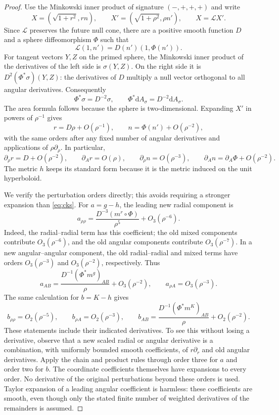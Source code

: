\begin{proof}
Use the Minkowski inner product of signature $(-,+,+,+)$ and write
\[
 X=(\sqrt{1+r^2},rn),\qquad
 X'=(\sqrt{1+\rho^2},\rho n'),\qquad X=\mathscr L X'.
\]
Since $\mathscr L$ preserves the future null cone, there are a positive
smooth function $D$ and a sphere diffeomorphism $\Phi$ such that
\begin{equation}\label{eq:lorentz-boundary}
 \mathscr L(1,n')=D(n')(1,\Phi(n')).
\end{equation}
For tangent vectors $Y,Z$ on the primed sphere, the Minkowski
inner product of the derivatives of the left side is $\sigma(Y,Z)$.
On the right side it is $D^2(\Phi^*\sigma)(Y,Z)$: the derivatives of
$D$ multiply a null vector orthogonal to all angular derivatives.
Consequently
\begin{equation}\label{eq:lorentz-conformal}
 \Phi^*\sigma=D^{-2}\sigma,
 \qquad \Phi^*\mathrm dA_\sigma=D^{-2}\mathrm dA_\sigma.
\end{equation}
The area formula follows because the sphere is two-dimensional.
Expanding $X'$ in powers of $\rho^{-1}$ gives
\[
 r=D\rho+O(\rho^{-1}),\qquad
 n=\Phi(n')+O(\rho^{-2}),
\]
with the same orders after any fixed number of angular derivatives and
applications of $\rho\partial_\rho$. In particular,
\[
 \partial_\rho r=D+O(\rho^{-2}),\qquad
 \partial_A r=O(\rho),\qquad
 \partial_\rho n=O(\rho^{-3}),\qquad
 \partial_A n=\partial_A\Phi+O(\rho^{-2}).
\]
The metric $h$ keeps its standard form because it is the metric induced
on the unit hyperboloid.

We verify the perturbation orders directly; this avoids requiring a
stronger expansion than \eqref{eq:cks}. For $a=g-h$, the leading new
radial component is
\[
 a_{\rho\rho}
 =\frac{D^{-3}(m^r\circ\Phi)}{\rho^5}+O_3(\rho^{-6}).
\]
Indeed, the radial--radial term has this coefficient; the old mixed
components contribute $O_3(\rho^{-6})$, and the old angular components
contribute $O_3(\rho^{-7})$. In a new angular--angular component, the
old radial--radial and mixed terms have orders $O_3(\rho^{-3})$ and
$O_3(\rho^{-2})$, respectively. Thus
\[
 a_{AB}
 =\frac{D^{-1}(\Phi^*m^g)_{AB}}{\rho}+O_3(\rho^{-2}),
 \qquad a_{\rho A}=O_3(\rho^{-3}).
\]
The same calculation for $b=K-h$ gives
\[
 b_{\rho\rho}=O_2(\rho^{-5}),\qquad
 b_{\rho A}=O_2(\rho^{-3}),\qquad
 b_{AB}=\frac{D^{-1}(\Phi^*m^K)_{AB}}{\rho}
       +O_2(\rho^{-2}).
\]
These statements include their indicated derivatives. To see this
without losing a derivative, observe that a new scaled radial or
angular derivative is a combination, with uniformly bounded smooth
coefficients, of $r\partial_r$ and old angular derivatives. Apply the
chain and product rules through order three for $a$ and order two for
$b$. The coordinate coefficients themselves have expansions to every
order. No derivative of the original perturbations beyond these orders
is used. Taylor expansion of a leading angular coefficient is harmless:
these coefficients are smooth, even though only the stated finite
number of weighted derivatives of the remainders is assumed.


\end{proof}
